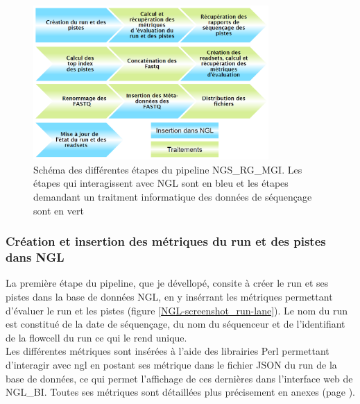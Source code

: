 \begin{figure}[H]
    \centering
    \includegraphics[width=0.8\textwidth]{img/schema-ngsrg-mgi.png}
    \caption{\footnotesize{Schéma des différentes étapes du pipeline NGS\_RG\_MGI. Les étapes qui interagissent avec NGL sont en bleu et les étapes demandant un traitment informatique des données de séquençage sont en vert}}
    \label{schema-ngsrg-mgi}
\end{figure}

\subsubsection*{Création et insertion des métriques du run et des pistes dans NGL }
La première étape du pipeline, que je dévellopé, consite à créer le run et ses pistes dans la base de données NGL, en y insérrant les métriques permettant d'évaluer le run et les pistes (figure \ref{NGL-screenshot_run-lane}).
Le nom du run est constitué de la date de séquençage, du nom du séquenceur et de l'identifiant de la flowcell du run ce qui le rend unique.\\

Les différentes métriques sont insérées à l'aide des librairies Perl permettant d'interagir avec ngl en postant ses métrique dans le fichier JSON du run de la base de données, ce qui permet l'affichage de ces dernières dans l'interface web de NGL\_BI. Toutes ses métriques sont détaillées plus précisement en anexes (page \pageref{anexes1}).\\

